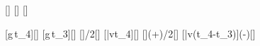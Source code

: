 [\mpss]
[\s]
[\s]

[g\,t_4]{\gEX*\tvX}[\mps]
[g\,t_3]{\gEX*\tdX}[\mps]
[]{\vvX/2}[\mps]
[\bar v\cdot t_4]{\vmvX*\tvX}[\m]
[]{(\vdX+\vvX)/2}[\mps]
[\bar v\cdot\left(t_4-t_3\right)]{\vmdX*(\tvX-\tdX)}[\m]
